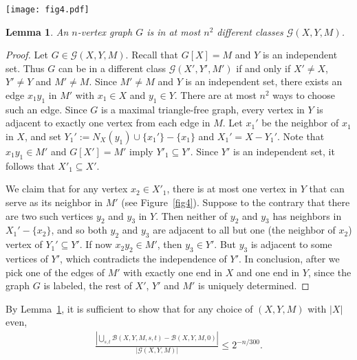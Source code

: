 \documentclass[12pt]{article}
\newtheorem{lemma}[theorem]{Lemma}
\theoremstyle{definition}
\theoremstyle{definition}
\theoremstyle{definition}
\theoremstyle{definition}
\theoremstyle{definition}
\theoremstyle{definition}
\theoremstyle{definition}
\newcommand{\cG}{\mathcal{G}}
\newcommand{\cB}{\mathcal{B}}
\newcommand{\3}{\bf{3}}
\newcommand{\setm}{-}
\begin{document}
\begin{figure*}[t!]
\centering
  \texttt{[image: fig4.pdf]}
    \caption{$(X',Y',M')$ is uniquely determined after choosing $x_1y_1\in M'$ (Lemma~\ref{lem-overcount}).}\label{fig4}
\end{figure*}


\begin{lemma}\label{lem-overcount}
An $n$-vertex graph $G$ is in at most $n^2$ different classes $\cG(X,Y,M)$.
\end{lemma}
\begin{proof}
Let $G\in \cG(X,Y,M)$. Recall that $G[X]=M$ and $Y$ is an independent set. Thus $G$ can be in a different class $\cG(X',Y',M')$ if and only if $X'\neq X$, $Y'\neq Y$ and $M'\neq M$. Since $M'\neq M$ and $Y$ is an independent set, there exists an edge $x_1y_1$ in $M'$ with $x_1\in X$ and $y_1\in Y$. There are at most $n^2$ ways to choose such an edge. Since $G$ is a maximal triangle-free graph, every vertex in $Y$ is adjacent to exactly one vertex from each edge in $M$. Let $x_1'$ be the neighbor of $x_1$ in $X$, and set $Y_1':=N_X(y_1)\cup\{x_1'\}-\{x_1\}$ and $X_1'=X\setm Y_1'$. Note that $x_1y_1\in M'$ and $G[X']=M'$ imply $Y'_1\subseteq Y'$. Since $Y'$ is an independent set, it follows that $X'_1\subseteq X'$. 

We claim that for any vertex $x_2\in X'_1$, there is at most one vertex in $Y$ that can serve as its neighbor in $M'$ (see Figure~\ref{fig4}). Suppose to the contrary that there are two such vertices $y_2$ and $y_3$ in $Y$. Then neither of $y_2$ and $y_3$ has neighbors in $X_1'-\{x_2\}$, and so both $y_2$ and $y_3$ are adjacent to all but one (the neighbor of $x_2$) vertex of $Y_1'\subseteq Y'$. If now $x_2y_2\in M'$, then $y_3\in Y'$. But $y_3$ is adjacent to some vertices of $Y'$, which contradicts the independence of $Y'$. In conclusion, after we pick one of the edges of $M'$ with exactly one end in $X$ and one end in $Y$, since the graph $G$ is labeled, the rest of $X'$, $Y'$ and $M'$ is uniquely determined. 
\end{proof}


By Lemma~\ref{lem-overcount}, it is sufficient to show that for any choice of $(X,Y,M)$ with $|X|$ even, 
\begin{eqnarray}\label{eq-ratio}
\frac{|\bigcup_{s,t}\cB(X,Y,M,s,t)\setm \cB(X,Y,M,0)|}{|\cG(X,Y,M)|}\le 2^{-n/300}.
\end{eqnarray}
\end{document}
